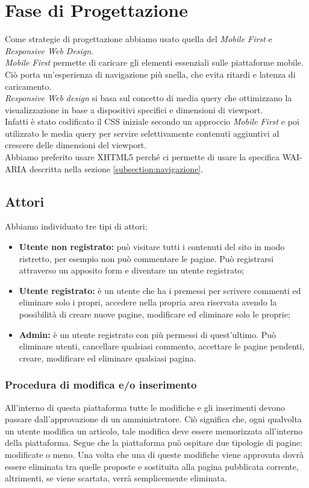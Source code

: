\section{Fase di Progettazione}
Come strategie di progettazione abbiamo usato quella del \textit{Mobile First} e \textit{Responsive Web Design}.\\
\textit{Mobile First} permette di caricare gli elementi essenziali sulle piattaforme mobile. Ciò porta un'esperienza di navigazione più snella, che evita ritardi e latenza di caricamento.\\
\textit{Responsive Web design} si basa sul concetto di media query che ottimizzano la visualizzazione in base a dispositivi specifici e dimensioni di viewport.\\
Infatti è stato codificato il CSS iniziale secondo un approccio \textit{Mobile First} e poi utilizzato le media query per servire selettivamente contenuti aggiuntivi al crescere delle dimensioni del viewport.\\
Abbiamo preferito usare XHTML5 perché ci permette di usare la specifica WAI-ARIA descritta nella sezione \ref{subsection:navigazione}.

\subsection{Attori}
Abbiamo individuato tre tipi di attori:
\begin{itemize}
	\item \textbf{Utente non registrato:} può visitare tutti i contenuti del sito in modo ristretto, per esempio non può commentare le pagine. Può registrarsi attraverso un apposito form e diventare un utente registrato;
	\item \textbf{Utente registrato:} è un utente che ha i premessi per scrivere commenti ed eliminare solo i propri, accedere nella propria area riservata avendo la possibilità di creare nuove pagine, modificare ed eliminare solo le proprie;
	\item \textbf{Admin:} è un utente registrato con più permessi di quest'ultimo. Può eliminare utenti, cancellare qualsiasi commento, accettare le pagine pendenti, creare, modificare ed eliminare qualsiasi pagina.
\end{itemize}

\subsubsection{Procedura di modifica e/o inserimento} \label{subsection:modificainserimento}
All'interno di questa piattaforma tutte le modifiche e gli inserimenti devono passare dall'approvazione di un amministratore. Ciò significa che, ogni qualvolta un utente modifica un articolo, tale modifica deve essere memorizzata all'interno della piattaforma. Segue che la piattaforma può ospitare due tipologie di pagine: modificate o meno. Una volta che una di queste modifiche viene approvata dovrà essere eliminata tra quelle proposte e sostituita alla pagina pubblicata corrente, altrimenti, se viene scartata, verrà semplicemente eliminata.

